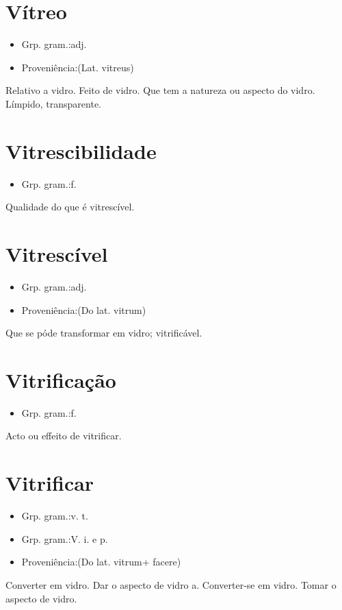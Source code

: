 \documentclass{article}
\begin{document}
\section{Vítreo}
\begin{itemize}
\item {Grp. gram.:adj.}
\end{itemize}
\begin{itemize}
\item {Proveniência:(Lat. \textunderscore vitreus\textunderscore )}
\end{itemize}
Relativo a vidro.
Feito de vidro.
Que tem a natureza ou aspecto do vidro.
Límpido, transparente.
\section{Vitrescibilidade}
\begin{itemize}
\item {Grp. gram.:f.}
\end{itemize}
Qualidade do que é vitrescível.
\section{Vitrescível}
\begin{itemize}
\item {Grp. gram.:adj.}
\end{itemize}
\begin{itemize}
\item {Proveniência:(Do lat. \textunderscore vitrum\textunderscore )}
\end{itemize}
Que se póde transformar em vidro; vitrificável.
\section{Vitrificação}
\begin{itemize}
\item {Grp. gram.:f.}
\end{itemize}
Acto ou effeito de vitrificar.
\section{Vitrificar}
\begin{itemize}
\item {Grp. gram.:v. t.}
\end{itemize}
\begin{itemize}
\item {Grp. gram.:V. i.  e  p.}
\end{itemize}
\begin{itemize}
\item {Proveniência:(Do lat. \textunderscore vitrum\textunderscore  + \textunderscore facere\textunderscore )}
\end{itemize}
Converter em vidro.
Dar o aspecto de vidro a.
Converter-se em vidro.
Tomar o aspecto de vidro.
\end{document}
